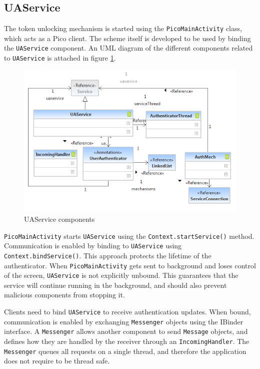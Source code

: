 \subsection{UAService}
The token unlocking mechanism is started using the {\tt PicoMainActivity} class, which acts as a Pico client. The scheme itself is developed to be used by binding the {\tt UAService} component. An UML diagram of the different components related to {\tt UAService} is attached in figure \ref{fig:uaservice}.
\begin{figure}[h]
    \centering
    \includegraphics[width=\textwidth]{Pictures/uaservice-brief}
    \caption{UAService components}
    \label{fig:uaservice}
\end{figure}

{\tt PicoMainActivity} starts {\tt UAService} using the {\tt Context.startService()} method. Communication is enabled by binding to {\tt UAService} using {\tt Context.bindService()}. This approach protects the lifetime of the authenticator. When {\tt PicoMainActivity} gets sent to background and loses control of the screen, {\tt UAService} is not explicitly unbound. This guarantees that the service will continue running in the background, and should also prevent malicious components from stopping it. 

Clients need to bind {\tt UAService} to receive authentication updates. When bound, communication is enabled by exchanging {\tt Messenger} objects using the IBinder interface. A {\tt Messenger} allows another component to send {\tt Message} objects, and defines how they are handled by the receiver through an {\tt IncomingHandler}. The {\tt Messenger} queues all requests on a single thread, and therefore the application does not require to be thread safe. 

